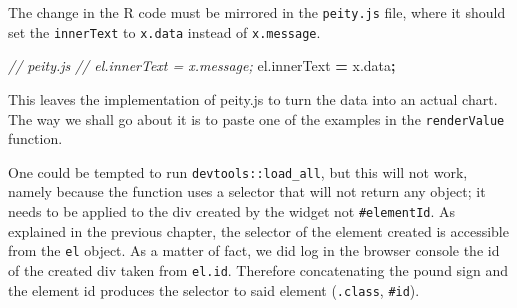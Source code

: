 \documentclass[10pt,]{krantz}
\makeatletter
\newenvironment{Shaded}{\begin{snugshade}}{\end{snugshade}}
\newcommand{\AttributeTok}[1]{\textcolor[rgb]{0.61,0.61,0.61}{#1}}
\newcommand{\CommentTok}[1]{\textcolor[rgb]{0.37,0.37,0.37}{\textit{#1}}}
\newcommand{\DataTypeTok}[1]{\textcolor[rgb]{0.27,0.27,0.27}{#1}}
\newcommand{\KeywordTok}[1]{\textcolor[rgb]{0.27,0.27,0.27}{\textbf{#1}}}
\newcommand{\NormalTok}[1]{#1}
\newcommand{\OperatorTok}[1]{\textcolor[rgb]{0.43,0.43,0.43}{\textbf{#1}}}
\newcommand{\StringTok}[1]{\textcolor[rgb]{0.5,0.5,0.5}{#1}}
\newcommand{\VariableTok}[1]{\textcolor[rgb]{0,0,0}{#1}}
\newenvironment{kframe}{%
\medskip{}
\setlength{\fboxsep}{.8em}
 \def\at@end@of@kframe{}%
 \ifinner\ifhmode%
  \def\at@end@of@kframe{\end{minipage}}%
  \begin{minipage}{\columnwidth}%
 \fi\fi%
 \def\FrameCommand##1{\hskip\@totalleftmargin \hskip-\fboxsep
 \colorbox{shadecolor}{##1}\hskip-\fboxsep
     \hskip-\linewidth \hskip-\@totalleftmargin \hskip\columnwidth}%
 \MakeFramed {\advance\hsize-\width
   \@totalleftmargin\z@ \linewidth\hsize
   \@setminipage}}%
 {\par\unskip\endMakeFramed%
 \at@end@of@kframe}
\renewenvironment{Shaded}{\begin{kframe}}{\end{kframe}}
\makeatother
\begin{document}
The change in the R code must be mirrored in the \texttt{peity.js} file, where it should set the \texttt{innerText} to \texttt{x.data} instead of \texttt{x.message}.

\begin{Shaded}
\begin{Highlighting}[]
\CommentTok{// peity.js}
\CommentTok{// el.innerText = x.message;}
\VariableTok{el}\NormalTok{.}\AttributeTok{innerText} \OperatorTok{=} \VariableTok{x}\NormalTok{.}\AttributeTok{data}\OperatorTok{;}
\end{Highlighting}
\end{Shaded}

This leaves the implementation of peity.js to turn the data into an actual chart. The way we shall go about it is to paste one of the examples in the \texttt{renderValue} function.

\begin{Shaded}
\end{Shaded}

One could be tempted to run \texttt{devtools::load\_all}, but this will not work, namely because the function uses a selector that will not return any object; it needs to be applied to the div created by the widget not \texttt{\#elementId}. As explained in the previous chapter, the selector of the element created is accessible from the \texttt{el} object. As a matter of fact, we did log in the browser console the id of the created div taken from \texttt{el.id}. Therefore concatenating the pound sign and the element id produces the selector to said element (\texttt{.class}, \texttt{\#id}).

\begin{Shaded}
\end{Shaded}
\end{document}

